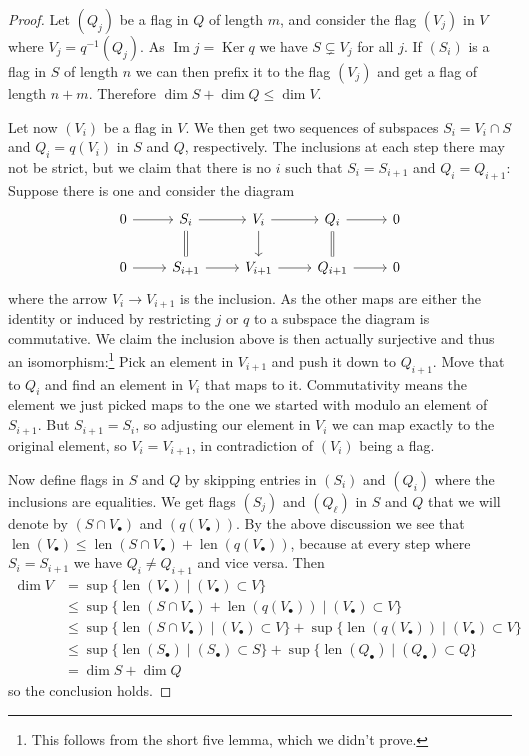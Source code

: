 \documentclass[11pt]{article}
\theoremstyle{definition}
\DeclareMathOperator{\Ker}{Ker}
\DeclareMathOperator{\Img}{Im}
\DeclareMathOperator{\len}{len}
\begin{document}
\begin{proof}
Let $(Q_j)$ be a flag in $Q$ of length $m$, and consider the flag
$(V_j)$ in $V$ where $V_j = q^{-1}(Q_j)$.
As $\Img j = \Ker q$ we have $S \subsetneq V_j$ for all $j$.
If $(S_i)$ is a flag in $S$ of length $n$ we can then prefix it to the flag $(V_j)$ and get a flag of length $n + m$.
Therefore $\dim S + \dim Q \leq \dim V$.

Let now $(V_i)$ be a flag in $V$.
We then get two sequences of subspaces $S_i = V_i \cap S$ and $Q_i = q(V_i)$ in $S$ and $Q$, respectively.
The inclusions at each step there may not be strict, but we claim that there is no $i$ such that $S_i = S_{i+1}$ and $Q_i = Q_{i+1}$:
Suppose there is one and consider the diagram
\[
\begin{tikzcd}
0 \ar[r] & S_i \ar[r] \ar[d,equal] & V_i \ar[r] \ar[d] & Q_i \ar[r] \ar[d,equal] & 0
\\
0 \ar[r] & S_{i+1} \ar[r] & V_{i+1} \ar[r] & Q_{i+1} \ar[r] & 0
\end{tikzcd}
\]
where the arrow $V_i \to V_{i+1}$ is the inclusion.
As the other maps are either the identity or induced by restricting $j$ or $q$ to a subspace the diagram is commutative.
We claim the inclusion above is then actually surjective and thus an isomorphism:\footnote{This follows from the short five lemma, which we didn't prove.}
Pick an element in $V_{i+1}$ and push it down to $Q_{i+1}$.
Move that to $Q_i$ and find an element in $V_i$ that maps to it.
Commutativity means the element we just picked maps to the one we started with modulo an element of $S_{i+1}$.
But $S_{i+1} = S_i$, so adjusting our element in $V_i$ we can map exactly to the original element, so $V_i = V_{i+1}$, in contradiction of $(V_i)$ being a flag.

Now define flags in $S$ and $Q$ by skipping entries in $(S_i)$ and $(Q_i)$ where the inclusions are equalities.
We get flags $(S_j)$ and $(Q_\ell)$ in $S$ and $Q$ that we will denote by $(S \cap V_\bullet)$ and $(q(V_\bullet))$.
By the above discussion we see that $\len(V_\bullet) \leq \len(S \cap V_\bullet) + \len(q(V_\bullet))$, because at every step where $S_i = S_{i+1}$ we have $Q_i \not= Q_{i+1}$ and vice versa.
Then
\begin{align*}
\dim V
&= \sup\{ \len(V_\bullet) \mid (V_\bullet) \subset V \}
\\
&\leq \sup\{ \len(S \cap V_\bullet) + \len(q(V_\bullet)) \mid (V_\bullet) \subset V \}
\\
&\leq \sup\{ \len(S \cap V_\bullet) \mid (V_\bullet) \subset V \} 
+ \sup \{\len(q(V_\bullet)) \mid (V_\bullet) \subset V \}
\\
&\leq \sup\{ \len(S_\bullet) \mid (S_\bullet) \subset S \} 
+ \sup \{\len(Q_\bullet) \mid (Q_\bullet) \subset Q \}
\\
&= \dim S + \dim Q
\end{align*}
so the conclusion holds.
\end{proof}
\end{document}
